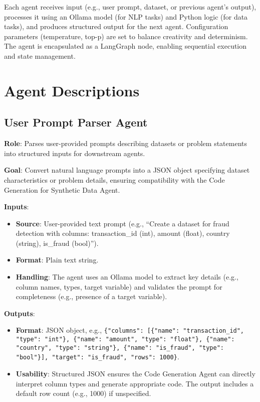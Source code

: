 \documentclass{article}
\begin{document}
Each agent receives input (e.g., user prompt, dataset, or previous agent’s output), processes it using an Ollama model (for NLP tasks) and Python logic (for data tasks), and produces structured output for the next agent. Configuration parameters (temperature, top-p) are set to balance creativity and determinism. The agent is encapsulated as a LangGraph node, enabling sequential execution and state management.

\section{Agent Descriptions}

\subsection{User Prompt Parser Agent}

\textbf{Role}: Parses user-provided prompts describing datasets or problem statements into structured inputs for downstream agents.

\textbf{Goal}: Convert natural language prompts into a JSON object specifying dataset characteristics or problem details, ensuring compatibility with the Code Generation for Synthetic Data Agent.

\textbf{Inputs}:
\begin{itemize}[label=--]
    \item \textbf{Source}: User-provided text prompt (e.g., “Create a dataset for fraud detection with columns: transaction\_id (int), amount (float), country (string), is\_fraud (bool)”).
    \item \textbf{Format}: Plain text string.
    \item \textbf{Handling}: The agent uses an Ollama model to extract key details (e.g., column names, types, target variable) and validates the prompt for completeness (e.g., presence of a target variable).
\end{itemize}

\textbf{Outputs}:
\begin{itemize}[label=--]
    \item \textbf{Format}: JSON object, e.g., \texttt{\{"columns": [\{"name": "transaction\_id", "type": "int"\}, \{"name": "amount", "type": "float"\}, \{"name": "country", "type": "string"\}, \{"name": "is\_fraud", "type": "bool"\}], "target": "is\_fraud", "rows": 1000\}}.
    \item \textbf{Usability}: Structured JSON ensures the Code Generation Agent can directly interpret column types and generate appropriate code. The output includes a default row count (e.g., 1000) if unspecified.
\end{itemize}
\end{document}
